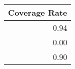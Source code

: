 \begin{tabular}{r}
  \hline
Coverage Rate \\ 
  \hline
0.94 \\ 
  0.00 \\ 
  0.90 \\ 
   \hline
\end{tabular}
